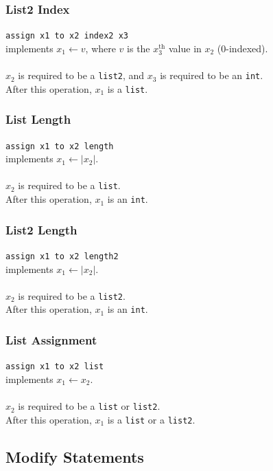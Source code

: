 \documentclass{report}
\begin{document}
\subsubsection{List2 Index}

\texttt{assign x1 to x2 index2 x3} \\
implements $x_1 \leftarrow v$, where $v$ is the $x_3^{\textrm{th}}$ value in $x_2$ (0-indexed). \\ \\
$x_2$ is required to be a \texttt{list2}, and $x_3$ is required to be an \texttt{int}. \\
After this operation, $x_1$ is a \texttt{list}.

\subsubsection{List Length}

\texttt{assign x1 to x2 length} \\
implements $x_1 \leftarrow |x_2|$. \\ \\ 
$x_2$ is required to be a \texttt{list}. \\
After this operation, $x_1$ is an \texttt{int}.

\subsubsection{List2 Length} 

\texttt{assign x1 to x2 length2} \\
implements $x_1 \leftarrow |x_2|$. \\ \\  
$x_2$ is required to be a \texttt{list2}. \\
After this operation, $x_1$ is an \texttt{int}.

\subsubsection{List Assignment}

\texttt{assign x1 to x2 list} \\
implements $x_1 \leftarrow x_2$. \\ \\  
$x_2$ is required to be a \texttt{list} or \texttt{list2}. \\
After this operation, $x_1$ is a \texttt{list} or a \texttt{list2}.

\subsection{Modify Statements}
\end{document}
